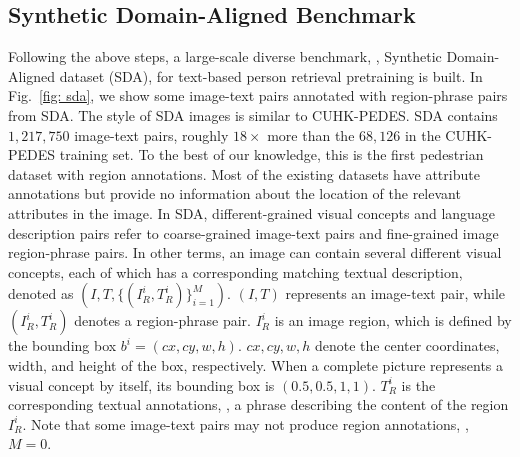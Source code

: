 \subsection{Synthetic Domain-Aligned Benchmark} 
\noindent Following the above steps, a large-scale diverse benchmark, \ie, Synthetic Domain-Aligned dataset (SDA), for text-based person retrieval pretraining is built.
In Fig.~\ref{fig: sda}, we show some image-text pairs annotated with region-phrase pairs from SDA. 
The style of SDA images is similar to CUHK-PEDES.
SDA contains $1,217,750$ image-text pairs, roughly $18 \times$ more than the $68,126$ in the CUHK-PEDES training set.
To the best of our knowledge, this is the first pedestrian dataset with region annotations. 
Most of the existing datasets have attribute annotations but provide no information about the location of the relevant attributes in the image.
In SDA, different-grained visual concepts and language description pairs refer to coarse-grained image-text pairs and fine-grained image region-phrase pairs. 
In other terms, an image can contain several different visual concepts, each of which has a corresponding matching textual description, denoted as $(I, T, \{(I_R^i, T_R^i)\}^M_{i=1})$.
$(I, T)$ represents an image-text pair, while $(I_R^i, T_R^i)$ denotes a region-phrase pair.
$I_R^i$ is an image region, which is defined by the bounding box $b^i=(cx, cy, w, h)$. $cx, cy, w, h$ denote the center coordinates, width, and height of the box, respectively. 
When a complete picture represents a visual concept by itself, its bounding box is $(0.5, 0.5, 1, 1)$.
$T_R^i$ is the corresponding textual annotations, \ie, a phrase describing the content of the region $I_R^i$. 
Note that some image-text pairs may not produce region annotations, \ie, $M = 0$. 


